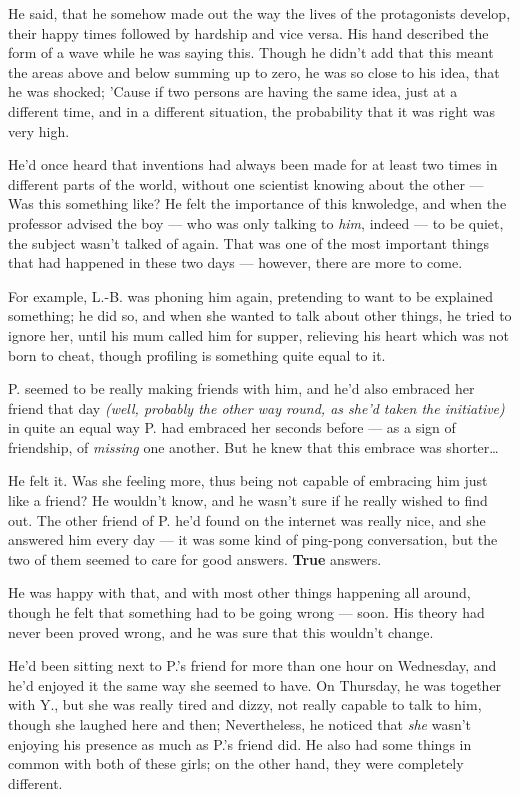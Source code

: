 He said, that he somehow made out the way the lives of the protagonists develop, their happy times followed by hardship and vice versa. 
His hand described the form of a wave while he was saying this. 
Though he didn't add that this meant the areas above and below summing up to zero, he was so close to his idea, that he was shocked; 'Cause if two persons are having the same idea, just at a different time, and in a different situation, the probability that it was right was very high.

He'd once heard that inventions had always been made for at least two times in different parts of the world, without one scientist knowing about the other --- Was this something like?
He felt the importance of this knwoledge, and when the professor advised the boy --- who was only talking to \emph{him}, indeed --- to be quiet, the subject wasn't talked of again. 
That was one of the most important things that had happened in these two days --- however, there are more to come.

For example, L.-B. was phoning him again, pretending to want to be explained something; he did so, and when she wanted to talk about other things, he tried to ignore her, until his mum called him for supper, relieving his heart which was not born to cheat, though profiling is something quite equal to it.

P. seemed to be really making friends with him, and he'd also embraced her friend that day \emph{(well, probably the other way round, as she'd taken the initiative)} in quite an equal way P. had embraced her seconds before --- as a sign of friendship, of \emph{missing} one another. But he knew that this embrace was shorter\ldots

He felt it. Was she feeling more, thus being not capable of embracing him just like a friend?
He wouldn't know, and he wasn't sure if he really wished to find out. 
The other friend of P. he'd found on the internet was really nice, and she answered him every day --- it was some kind of ping-pong conversation, but the two of them seemed to care for good answers. 
\textbf{True} answers.

He was happy with that, and with most other things happening all around, though he felt that something had to be going wrong --- soon. His theory had never been proved wrong, and he was sure that this wouldn't change.

He'd been sitting next to P.'s friend for more than one hour on Wednesday, and he'd enjoyed it the same way she seemed to have. On Thursday, he was together with Y., but she was really tired and dizzy, not really capable to talk to him, though she laughed here and then; Nevertheless, he noticed that \emph{she} wasn't enjoying his presence as much as P.'s friend did. 
He also had some things in common with both of these girls; on the other hand, they were completely different.

